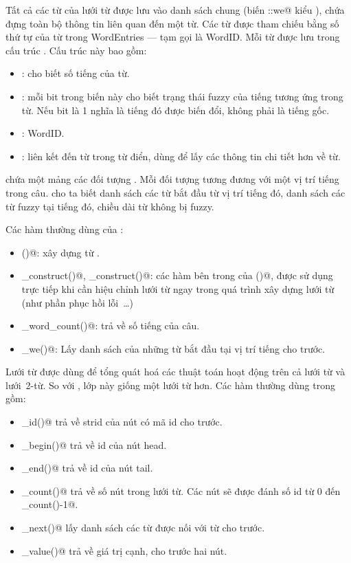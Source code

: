 \documentclass[a4paper,oneside,14pt]{extbook} %
\begin{document}
Tất cả các từ của lưới từ được lưu vào danh sách chung (biến
\verb@Lattice::we@ kiểu \verb@WordEntries@), chứa đựng toàn bộ thông tin
liên quan đến một từ. Các từ được tham chiếu bằng số thứ tự của từ
trong WordEntries --- tạm gọi là WordID. Mỗi từ được lưu trong cấu
trúc \verb@WordEntry@. Cấu trúc này bao gồm:
\begin{itemize}
\item \verb@len@: cho biết số tiếng của từ.
\item \verb@fuzid@: mỗi bit trong biến này cho biết trạng thái fuzzy
  của tiếng tương ứng trong từ. Nếu bit là 1 nghĩa là tiếng đó được
  biến đổi, không phải là tiếng gốc.
\item \verb@id@: WordID.
\item \verb@node@: liên kết đến từ trong từ điển, dùng để lấy các
  thông tin chi tiết hơn về từ.
\end{itemize}

\verb@Lattice@ chứa một mảng các đối tượng \verb@WordInfos@. Mỗi đối
tượng \verb@WordInfo@ tương đương với một vị trí tiếng trong
câu. \verb@WordInfos@ cho ta biết danh sách các từ bắt đầu từ vị trí
tiếng đó, danh sách các từ fuzzy tại tiếng đó, chiều dài từ không bị
fuzzy. 

Các hàm thường dùng của \verb@Lattice@:
\begin{itemize}
\item \verb@construct()@: xây dựng \verb@Lattice@ từ \verb@Sentence@.
\item \verb@pre_construct()@, \verb@post_construct()@: các hàm bên
  trong của \verb@construct()@, được sử dụng trực tiếp khi cần hiệu
  chỉnh lưới từ ngay trong quá trình xây dựng lưới từ (như phần phục
  hồi lỗi~\ldots)
\item \verb@get_word_count()@: trả về số tiếng của câu.
\item \verb@get_we()@: Lấy danh sách \verb@WordEntry@ của những từ bắt
  đầu tại vị trí tiếng cho trước.
\end{itemize}

Lưới từ \verb@DAG@ được dùng để tổng quát hoá các thuật toán hoạt động
trên cả lưới từ và lưới~2-từ. So với \verb@Lattice@, lớp này giống một
lưới từ hơn. Các hàm thường dùng trong \verb@DAG@ gồm:
\begin{itemize}
\item \verb@node_id()@ trả về strid của nút có mã id cho trước.
\item \verb@node_begin()@ trả về id của nút head.
\item \verb@node_end()@ trả về id của nút tail.
\item \verb@node_count()@ trả về số nút trong lưới từ. Các nút sẽ được
  đánh số id từ 0 đến \verb@node_count()-1@.
\item \verb@get_next()@ lấy danh sách các từ được nối với từ cho
  trước.
\item \verb@edge_value()@ trả về giá trị cạnh, cho trước hai nút.
\end{itemize}
\end{document}
